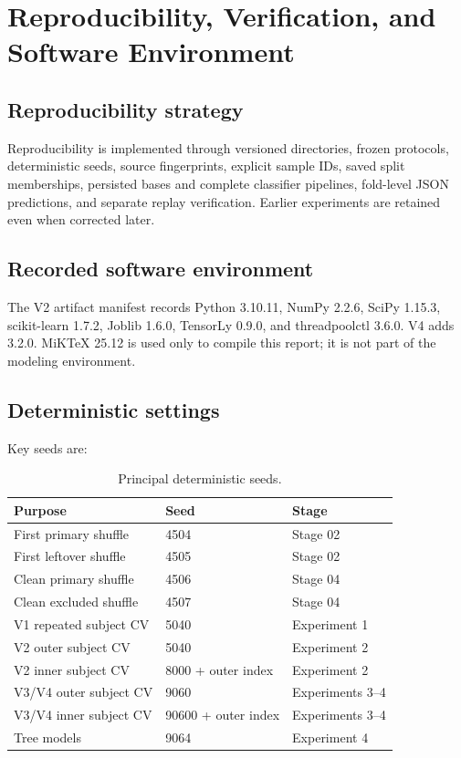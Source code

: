 \chapter{Reproducibility, Verification, and Software Environment}
\label{ch:reproducibility}

\section{Reproducibility strategy}

Reproducibility is implemented through versioned directories, frozen protocols,
deterministic seeds, source fingerprints, explicit sample IDs, saved split
memberships, persisted bases and complete classifier pipelines, fold-level JSON
predictions, and separate replay verification. Earlier experiments are retained
even when corrected later.

\section{Recorded software environment}

The V2 artifact manifest records Python 3.10.11, NumPy 2.2.6, SciPy 1.15.3,
scikit-learn 1.7.2, Joblib 1.6.0, TensorLy 0.9.0, and threadpoolctl 3.6.0. V4 adds
 3.2.0. MiKTeX 25.12 is used only to compile this report; it is
not part of the modeling environment.

\section{Deterministic settings}

Key seeds are:

\begin{table}[htbp]
\centering
\begin{tabular}{lll}
\toprule
\textbf{Purpose} & \textbf{Seed} & \textbf{Stage}\\
\midrule
First primary shuffle & 4504 & Stage 02\\
First leftover shuffle & 4505 & Stage 02\\
Clean primary shuffle & 4506 & Stage 04\\
Clean excluded shuffle & 4507 & Stage 04\\
V1 repeated subject CV & 5040 & Experiment 1\\
V2 outer subject CV & 5040 & Experiment 2\\
V2 inner subject CV & 8000 + outer index & Experiment 2\\
V3/V4 outer subject CV & 9060 & Experiments 3--4\\
V3/V4 inner subject CV & 90600 + outer index & Experiments 3--4\\
Tree models & 9064 & Experiment 4\\
\bottomrule
\end{tabular}
\caption{Principal deterministic seeds.}
\label{tab:seeds}
\end{table}

